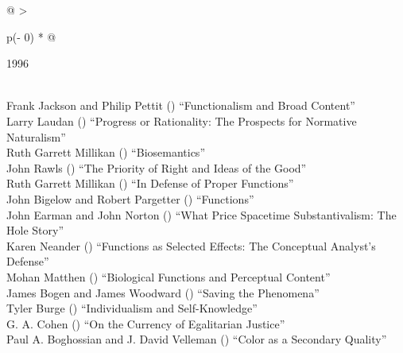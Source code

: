 \documentclass[
  10pt,
  letterpaper,
  DIV=11,
  numbers=noendperiod,
  twoside]{scrartcl}
\begin{document}
\begin{longtable}[]{@{}
  >{\raggedright\arraybackslash}p{(\columnwidth - 0\tabcolsep) * }@{}}

\caption{\label{tbl-top-ten-1987}Most cited articles published less than
ten years ago as of 1996.}

\tabularnewline

\toprule\noalign{}
\begin{minipage}[b]{\linewidth}\raggedright
1996
\end{minipage} \\
\midrule\noalign{}
\endhead
\bottomrule\noalign{}
\endlastfoot
Frank Jackson and Philip Pettit
()
``Functionalism and Broad Content'' \\
Larry Laudan
()
``Progress or Rationality: The Prospects for Normative Naturalism'' \\
Ruth Garrett Millikan
()
``Biosemantics'' \\
John Rawls
()
``The Priority of Right and Ideas of the Good'' \\
Ruth Garrett Millikan
()
``In Defense of Proper Functions'' \\
John Bigelow and Robert Pargetter
()
``Functions'' \\
John Earman and John Norton
()
``What Price Spacetime Substantivalism: The Hole Story'' \\
Karen Neander
()
``Functions as Selected Effects: The Conceptual Analyst's Defense'' \\
Mohan Matthen
()
``Biological Functions and Perceptual Content'' \\
James Bogen and James Woodward
()
``Saving the Phenomena'' \\
Tyler Burge
()
``Individualism and Self-Knowledge'' \\
G. A. Cohen
()
``On the Currency of Egalitarian Justice'' \\
Paul A. Boghossian and J. David Velleman
()
``Color as a Secondary Quality'' \\

\end{longtable}
\end{document}
